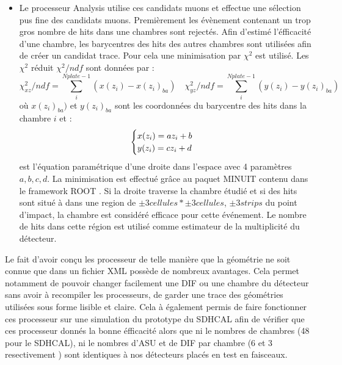 \begin{itemize}[label=$\bullet$]
	\item Le processeur Analysis utilise ces candidats muons et effectue une sélection pus fine des candidats muons. Premièrement les évènement contenant un trop gros nombre de hits dans une chambres sont rejectés. Afin d'estimé l'éfficacité d'une chambre, les barycentres des hits des autres chambres sont utilisées afin de créer un candidat trace. Pour cela une minimisation par $\chi^2$ est utilisé. Les $\chi^2$ réduit $\chi^2/ndf$ sont données par :
	\begin{equation}
	\chi_{xz}^2/ndf=\sum_i^{Nplate-1}(x(z_{i})-x(z_{i})_{ba}) \quad \chi_{yz}^2/ndf=\sum_i^{Nplate-1}(y(z_{i})-y(z_{i})_{ba})
	\end{equation}
	où $x(z_{i})_{ba})$ et $y(z_{i})_{ba}$ sont les coordonnées du barycentre des hits dans la chambre $i$ et :
\begin{equation}
\begin{cases}
\strut x(z_i)=az_i+b\\
y(z_i)=cz_i+d
\end{cases}
\end{equation}
est l'équation paramétrique d'une droite dans l'espace avec 4 paramètres $a,b,c,d$. La minimisation est effectué grâce au paquet MINUIT \cite{James:2004xla} contenu dans le framework ROOT \cite{BRUN199781}.
Si la droite traverse la chambre étudié et si des hits sont situé à dans une region de $\pm 3 cellules*\pm 3 cellules$, $\pm 3 strips$ du point d'impact, la chambre est considéré efficace pour cette événement. Le nombre de hits dans cette région est utilisé comme estimateur de la multiplicité du détecteur.
\end{itemize}

Le fait d'avoir conçu les processeur de telle manière que la géométrie ne soit connue que dans un fichier XML possède de nombreux avantages. Cela permet notamment de pouvoir changer facilement une DIF ou une chambre du détecteur sans avoir à recompiler les processeurs, de garder une trace des géométries utilisées sous forme lisible et claire. Cela à également permis de faire fonctionner ces processeur sur une simulation du prototype du SDHCAL afin de vérifier que ces processeur donnés la bonne éfficacité alors que ni le nombres de chambres (48 pour le SDHCAL), ni le nombres d'ASU et de DIF par chambre (6 et 3 resectivement ) sont identiques à nos détecteurs placés en test en faisceaux.

